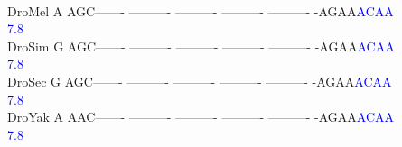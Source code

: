 \documentclass[11pt,twoside,reqno,a4paper]{article}
\begin{document}
{\\
DroMel	A	AGC-------	----------	----------	----------	----------	-AGAA\textcolor{Blue}{A}\textcolor{Blue}{C}\textcolor{Blue}{A}\textcolor{Blue}{A}\\
\hspace*{7\charwidth}\hspace*{1\charwidth}\hspace*{1\charwidth}\hspace*{1\charwidth}\hspace*{1\charwidth}\hspace*{1\charwidth}\hspace*{1\charwidth}\hspace*{56\charwidth}\textcolor{Blue}{7.8}\\
DroSim	G	AGC-------	----------	----------	----------	----------	-AGAA\textcolor{Blue}{A}\textcolor{Blue}{C}\textcolor{Blue}{A}\textcolor{Blue}{A}\\
\hspace*{7\charwidth}\hspace*{1\charwidth}\hspace*{1\charwidth}\hspace*{1\charwidth}\hspace*{1\charwidth}\hspace*{1\charwidth}\hspace*{1\charwidth}\hspace*{56\charwidth}\textcolor{Blue}{7.8}\\
DroSec	G	AGC-------	----------	----------	----------	----------	-AGAA\textcolor{Blue}{A}\textcolor{Blue}{C}\textcolor{Blue}{A}\textcolor{Blue}{A}\\
\hspace*{7\charwidth}\hspace*{1\charwidth}\hspace*{1\charwidth}\hspace*{1\charwidth}\hspace*{1\charwidth}\hspace*{1\charwidth}\hspace*{1\charwidth}\hspace*{56\charwidth}\textcolor{Blue}{7.8}\\
DroYak	A	AAC-------	----------	----------	----------	----------	-AGAA\textcolor{Blue}{A}\textcolor{Blue}{C}\textcolor{Blue}{A}\textcolor{Blue}{A}\\
\hspace*{7\charwidth}\hspace*{1\charwidth}\hspace*{1\charwidth}\hspace*{1\charwidth}\hspace*{1\charwidth}\hspace*{1\charwidth}\hspace*{1\charwidth}\hspace*{56\charwidth}\textcolor{Blue}{7.8}\\
}
\end{document}

